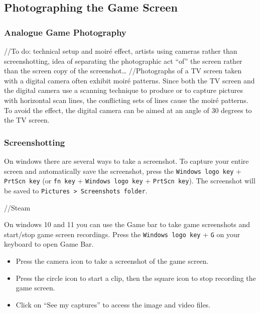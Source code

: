 \documentclass[
  openany]{book}
\begin{document}
\hypertarget{photographing-the-game-screen}{%
\subsection*{Photographing the Game Screen}\label{photographing-the-game-screen}}

\hypertarget{analogue-game-photography}{%
\subsubsection*{Analogue Game Photography}\label{analogue-game-photography}}

//To do: technical setup and moiré effect, artists using cameras rather than screenshotting, idea of separating the photographic act ``of'' the screen rather than the screen copy of the screenshot\ldots{}
//Photographs of a TV screen taken with a digital camera often exhibit moiré patterns. Since both the TV screen and the digital camera use a scanning technique to produce or to capture pictures with horizontal scan lines, the conflicting sets of lines cause the moiré patterns. To avoid the effect, the digital camera can be aimed at an angle of 30 degrees to the TV screen.

\hypertarget{screenshotting}{%
\subsubsection*{Screenshotting}\label{screenshotting}}

On windows there are several ways to take a screenshot. To capture your entire screen and automatically save the screenshot, press the \texttt{Windows\ logo\ key} + \texttt{PrtScn\ key} (or \texttt{fn\ key} + \texttt{Windows\ logo\ key} + \texttt{PrtScn\ key}). The screenshot will be saved to \texttt{Pictures\ \textgreater{}\ Screenshots\ folder}.

//Steam

On windows 10 and 11 you can use the Game bar to take game screenshots and start/stop game screen recordings. Press the \texttt{Windows\ logo\ key} + \texttt{G} on your keyboard to open Game Bar.

\begin{itemize}
\item
  Press the camera icon to take a screenshot of the game screen.
\item
  Press the circle icon to start a clip, then the square icon to stop recording the game screen.
\item
  Click on ``See my captures'' to access the image and video files.
\end{itemize}
\end{document}
